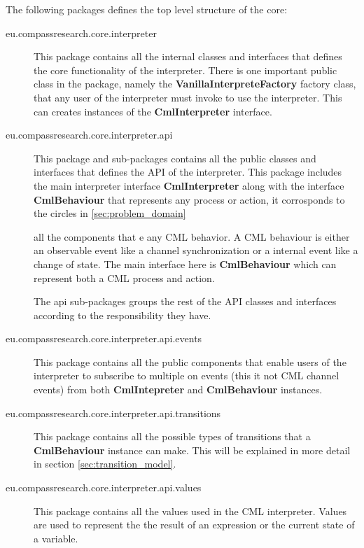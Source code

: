 \documentclass[a4paper, 10pt]{include/compassreport}   %
\begin{document}
The following packages defines the top level structure of the core:
\begin{description}

\item[eu.compassresearch.core.interpreter] This package contains all
  the internal classes and interfaces that defines the core
  functionality of the interpreter. There is one important public class
  in the package, namely the \textbf{VanillaInterpreteFactory} factory
  class, that any user of the interpreter must invoke to use the
  interpreter. This can creates instances of the \textbf{CmlInterpreter}
  interface.
  
\item[eu.compassresearch.core.interpreter.api] This package and
  sub-packages contains all the public classes and interfaces that
  defines the API of the interpreter. This package includes the main
  interpreter interface \textbf{CmlInterpreter} along with the interface
  \textbf{CmlBehaviour} that represents any process or action, it
  corrosponds to the circles in \autoref{sec:problem_domain}




all the components that e any CML behavior. A CML
  behaviour is either an observable event like a channel synchronization
  or a internal event like a change of state. The main interface here is
  \textbf{CmlBehaviour} which can represent both a CML process and action.

  The api sub-packages groups the rest of the API classes and
  interfaces according to the responsibility they have.

\item[eu.compassresearch.core.interpreter.api.events] This package
  contains all the public components that enable users of the
  interpreter to subscribe to multiple on events (this it not CML
  channel events) from both \textbf{CmlIntepreter} and
  \textbf{CmlBehaviour} instances.

\item[eu.compassresearch.core.interpreter.api.transitions] This
  package contains all the possible types of transitions that a
  \textbf{CmlBehaviour} instance can make. This will be explained in
  more detail in section \ref{sec:transition_model}.

\item[eu.compassresearch.core.interpreter.api.values] This package
  contains all the values used in the CML interpreter. Values are used
  to represent the the result of an expression or the current state of a
  variable.


\end{description}
\end{document}
